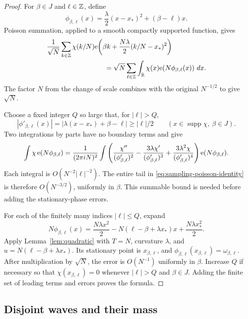 \begin{proof}
For $\beta\in J$ and $\ell\in\mathbb Z$, define
\[
 \phi_{\beta,\ell}(x)
   =\frac{\lambda}{2}(x-x_*)^2+(\beta-\ell)x.
\]
Poisson summation, applied to a smooth compactly supported function,
gives
\begin{align}
 &\frac1{\sqrt N}\sum_{k\in\Z}\chi(k/N)
   \e\!\left(\beta k+\frac{N\lambda}{2}(k/N-x_*)^2\right)
 \notag\\
 &\hspace{30mm}=
 \sqrt N\sum_{\ell\in\Z}
       \int_\R\chi(x)\e\!\left(N\phi_{\beta,\ell}(x)\right)\,dx.
 \label{eq:sampling-poisson-identity}
\end{align}
The factor $N$ from the change of scale combines with the original
$N^{-1/2}$ to give $\sqrt N$.

Choose a fixed integer $Q$ so large that, for $|\ell|>Q$,
\[
 |\phi'_{\beta,\ell}(x)|
   =|\lambda(x-x_*)+\beta-\ell|\ge |\ell|/2
 \qquad(x\in\operatorname{supp}\chi,\ \beta\in J).
\]
Two integrations by parts have no boundary terms and give
\begin{align*}
 \int\chi\,\mathrm e(N\phi_{\beta,\ell})
  =\frac1{(2\pi iN)^2}\int
  \left(
   \frac{\chi''}{(\phi'_{\beta,\ell})^2}
   -\frac{3\lambda\chi'}{(\phi'_{\beta,\ell})^3}
   +\frac{3\lambda^2\chi}{(\phi'_{\beta,\ell})^4}
  \right)\mathrm e(N\phi_{\beta,\ell}).
\end{align*}
Each integral is $O(N^{-2}|\ell|^{-2})$.  The entire tail in
\eqref{eq:sampling-poisson-identity} is therefore $O(N^{-3/2})$,
uniformly in $\beta$.  This summable bound is needed before adding
the stationary-phase errors.

For each of the finitely many indices $|\ell|\le Q$, expand
\[
 N\phi_{\beta,\ell}(x)
 =\frac{N\lambda x^2}{2}
   -N(\ell-\beta+\lambda x_*)x+\frac{N\lambda x_*^2}{2}.
\]
Apply Lemma~\ref{lem:quadratic} with $T=N$, curvature $\lambda$, and
$u=N(\ell-\beta+\lambda x_*)$.  Its stationary point is
$x_{\beta,\ell}$, and
$\phi_{\beta,\ell}(x_{\beta,\ell})=\omega_{\beta,\ell}$.
After multiplication by $\sqrt N$, the error is $O(N^{-1})$ uniformly
in $\beta$.  Increase $Q$ if necessary so that
$\chi(x_{\beta,\ell})=0$ whenever $|\ell|>Q$ and $\beta\in J$.
Adding the finite set of leading terms and errors proves the formula.
\end{proof}

\subsection{Disjoint waves and their mass}

